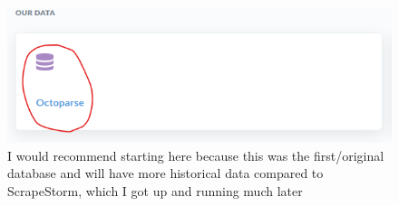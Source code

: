 \documentclass[
]{book}
\begin{document}
\begin{figure}
\centering
\includegraphics{images/OctoparseClick.png}
\caption{I would recommend starting here because this was the first/original database and will have more historical data compared to ScrapeStorm, which I got up and running much later}
\end{figure}
\end{document}

